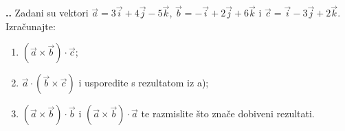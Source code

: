 
\noindent 
\textbf{
\thecjelina.\thezadatak.}
Zadani su vektori $\vec{a}=3\vec{i}+4\vec{j}-5\vec{k}$,  $\vec{b} = -\vec{i}+2\vec{j}+6\vec{k}$ i $\vec{c}=\vec{i}-3\vec{j}+2\vec{k}$. Izračunajte:
\begin{enumerate}[label=\alph*)]
 \item $ ( \vec{a}\times \vec{b} )\cdot \vec{c}$;
 \item $\vec{a}\cdot (\vec{b}\times\vec{c})$ i usporedite s rezultatom iz a);
 \item $(\vec{a}\times \vec{b})\cdot\vec{b}$ i $(\vec{a}\times \vec{b})\cdot\vec{a}$ te razmislite što znače dobiveni rezultati.
\end{enumerate}
